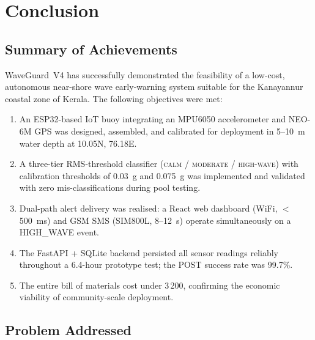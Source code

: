 \chapter{Conclusion}
\label{chap:conclusion}

\section{Summary of Achievements}

WaveGuard~V4 has successfully demonstrated the feasibility of a low-cost, autonomous
near-shore wave early-warning system suitable for the Kanayannur coastal zone of Kerala.
The following objectives were met:

\begin{enumerate}
  \item An ESP32-based IoT buoy integrating an MPU6050 accelerometer and NEO-6M GPS
        was designed, assembled, and calibrated for deployment in 5--10~m water depth
        at 10.05\textdegree{}N, 76.18\textdegree{}E.

  \item A three-tier RMS-threshold classifier (\textsc{calm} / \textsc{moderate} /
        \textsc{high-wave}) with calibration thresholds of 0.03~g and 0.075~g was
        implemented and validated with zero mis-classifications during pool testing.

  \item Dual-path alert delivery was realised: a React web dashboard (WiFi, $<$500~ms)
        and GSM SMS (SIM800L, 8--12~s) operate simultaneously on a HIGH\_WAVE event.

  \item The FastAPI + SQLite backend persisted all sensor readings reliably throughout
        a 6.4-hour prototype test; the POST success rate was 99.7\%.

  \item The entire bill of materials cost under \INR{}3\,200, confirming the
        economic viability of community-scale deployment.
\end{enumerate}

\section{Problem Addressed}

